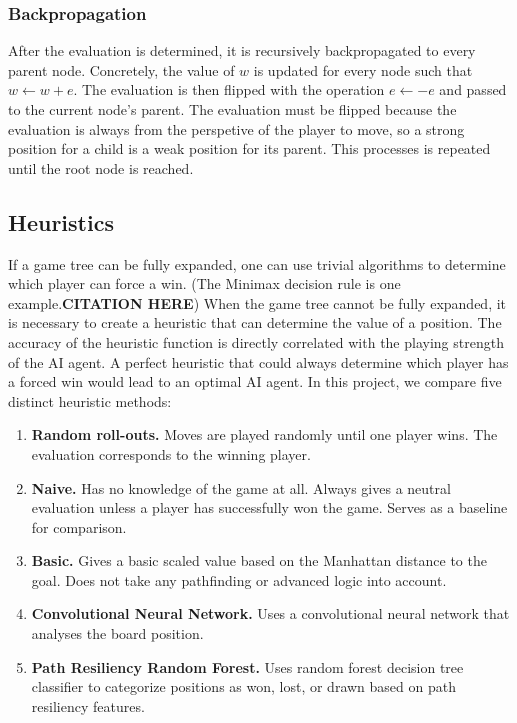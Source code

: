 \documentclass[10pt]{article}
\begin{document}
\subsubsection{Backpropagation}

After the evaluation is determined, it is recursively backpropagated to every parent node. Concretely, the value of $w$ is updated for every node such that $w \gets w + e$. The evaluation is then flipped with the operation $e \gets -e$ and passed to the current node's parent. The evaluation must be flipped because the evaluation is always from the perspetive of the player to move, so a strong position for a child is a weak position for its parent. This processes is repeated until the root node is reached.

\subsection{Heuristics}

If a game tree can be fully expanded, one can use trivial algorithms to determine which player can force a win. (The Minimax decision rule is one example.\textbf{CITATION HERE}) When the game tree cannot be fully expanded, it is necessary to create a heuristic that can determine the value of a position. The accuracy of the heuristic function is directly correlated with the playing strength of the AI agent. A perfect heuristic that could always determine which player has a forced win would lead to an optimal AI agent. In this project, we compare five distinct heuristic methods:

\begin{enumerate}
    \item \textbf{Random roll-outs.} Moves are played randomly until one player wins. The evaluation corresponds to the winning player.
    \item \textbf{Naive.} Has no knowledge of the game at all. Always gives a neutral evaluation unless a player has successfully won the game. Serves as a baseline for comparison.
    \item \textbf{Basic.} Gives a basic scaled value based on the Manhattan distance to the goal. Does not take any pathfinding or advanced logic into account.
    \item \textbf{Convolutional Neural Network.} Uses a convolutional neural network that analyses the board position.
    \item \textbf{Path Resiliency Random Forest.} Uses random forest decision tree classifier to categorize positions as won, lost, or drawn based on path resiliency features.
\end{enumerate}
\end{document}
